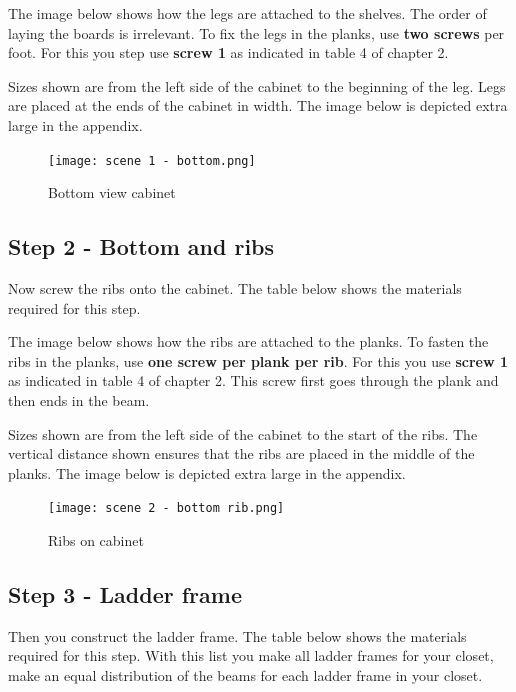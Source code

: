 \documentclass{article}
\begin{document}


The image below shows how the legs are attached to the shelves. The order of laying the boards is irrelevant. To fix the legs in the planks, use \textbf{two screws} per foot. For this you step use \textbf{screw 1} as indicated in table 4 of chapter 2.

Sizes shown are from the left side of the cabinet to the beginning of the leg. Legs are placed at the ends of the cabinet in width. The image below is depicted extra large in the appendix.

\begin{figure}[h!]
    \centering
    \texttt{[image: scene 1 - bottom.png]}
    \caption{Bottom view cabinet}
    \label{fig:stap 1}
\end{figure}

\clearpage
\newpage

\subsection{Step 2 - Bottom and ribs}

Now screw the ribs onto the cabinet. The table below shows the materials required for this step.



The image below shows how the ribs are attached to the planks. To fasten the ribs in the planks, use \textbf{one screw per plank per rib}. For this you use \textbf{screw 1} as indicated in table 4 of chapter 2. This screw first goes through the plank and then ends in the beam.

Sizes shown are from the left side of the cabinet to the start of the ribs. The vertical distance shown ensures that the ribs are placed in the middle of the planks. The image below is depicted extra large in the appendix.

\begin{figure}[h!]
    \centering
    \texttt{[image: scene 2 - bottom rib.png]}
    \caption{Ribs on cabinet}
    \label{fig:stap 2}
\end{figure}

\clearpage
\newpage

\subsection{Step 3 - Ladder frame}

Then you construct the ladder frame. The table below shows the materials required for this step. With this list you make all ladder frames for your closet, make an equal distribution of the beams for each ladder frame in your closet.
\end{document}
